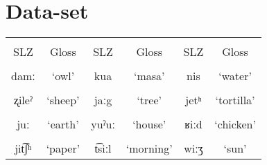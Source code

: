 \documentclass[12pt, letterpaper]{article}
\providecommand{\lsptoprule}{\midrule\toprule}
\providecommand{\lspbottomrule}{\bottomrule\midrule}
\begin{document}
\section{Data-set} \label{sec:WordSize}

\begin{table}[!h]
\centering
\label{tab:slqz}
 \begin{tabular}{cccccc}
  \lsptoprule
  	&&&&&\\
  	SLZ			&	 Gloss  & SLZ & Gloss & SLZ & Gloss  \\
  	\\
  	damː	& `owl' & kua & `masa' & nis & `water' \\
  	\\
  	ʐileˀ & `sheep' & jaːg & `tree' & jetʰ & `tortilla' \\
  	\\
  	juː & `earth' & yuˀuː & `house' & ʁiːd & `chicken' \\
  	\\
  	jit͡ʃʰ	 & `paper' & t͡siːl & `morning' & wiːʒ & `sun' \\
  \lspbottomrule
 \end{tabular}
\end{table}



\printbibliography[heading=bibintoc]
\end{document}
